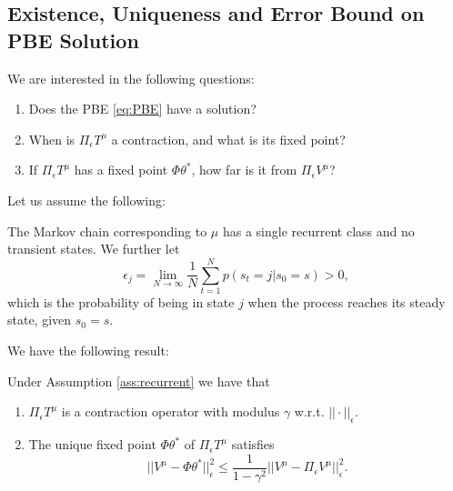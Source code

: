 \subsection{Existence, Uniqueness and Error Bound on PBE Solution}
We are interested in the following questions:
\begin{enumerate}
\item Does the PBE \eqref{eq:PBE} have a solution?
\item When is $\Pi_\epsilon T^\mu$ a contraction, and what is its fixed point?
\item If $\Pi_\epsilon T^\mu$ has a fixed point $\Phi\theta^*$, how far is it from $\Pi_\epsilon V^\mu$?
\end{enumerate}
Let us assume the following:
\begin{assumption}\label{ass:recurrent}The Markov chain corresponding to $\mu$ has a single recurrent class and no transient states. We further let
$$\epsilon_j = \lim_{N\rightarrow \infty} \frac{1}{N} \sum_{t=1}^N p(s_t=j|s_0=s)>0,$$
which is the probability of being in state $j$ when the process reaches its steady state, given $s_0=s$.
\end{assumption}
We have the following result:
\begin{proposition}\label{prop:PBE_contraction} Under Assumption \ref{ass:recurrent} we have that
\begin{enumerate}
\item $\Pi_\epsilon T^\mu$ is a contraction operator with modulus $\gamma$ w.r.t. $||\cdot||_\epsilon$.
\item The unique fixed point $\Phi \theta^*$ of $\Pi_\epsilon T^\mu$ satisfies
$$||V^\mu - \Phi \theta^*||_\epsilon^2 \le \frac{1}{1-\gamma^2}||V^\mu-\Pi_\epsilon V^\mu||_\epsilon^2.$$
\end{enumerate}
\end{proposition}

